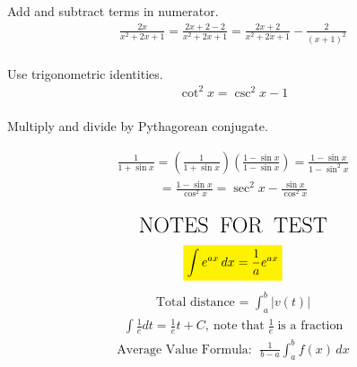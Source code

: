 \documentclass{report}
\begin{document}
Add and subtract terms in numerator.
\begin{align*}
	\frac{2 x}{x^2+2 x+1}=\frac{2 x+2-2}{x^2+2 x+1}=\frac{2 x+2}{x^2+2 x+1}-\frac{2}{(x+1)^2} \\
\end{align*}

Use trigonometric identities.
\begin{align*}
	\cot ^2 x=\csc ^2 x-1 \\
\end{align*}

Multiply and divide by Pythagorean conjugate.





\begin{align*}
	\frac{1}{1+\sin x}=\left(\frac{1}{1+\sin x}\right)\left(\frac{1-\sin x}{1-\sin x}\right)=\frac{1-\sin x}{1-\sin ^2 x}
\end{align*}
\begin{align*}
	=\frac{1-\sin x}{\cos ^2 x}=\sec ^2 x-\frac{\sin x}{\cos ^2 x} \\
\end{align*}

\begin{align*}
	\LARGE\text{NOTES \:FOR\: TEST}  \\
\end{align*}
\begin{equation*}
	\colorbox{yellow}{$\displaystyle \int e^{ax} \, dx = \frac{1}{a}e^{ax}$} \\\\
\end{equation*}
\begin{align*}
	\text{Total distance = } \int_a^b \big| v(t) \big|
\end{align*}
\begin{align*}
	\int\frac{1}{e}dt = \frac{1}{e}t + C,\: \text{note that}\;\frac{1}{e}\;\text{is a fraction}
\end{align*}
\begin{align*}
	\text{Average Value Formula: }\; \frac{1}{b-a} \int_{a}^{b}f(x)\,dx
\end{align*}
\\\\\\\\
\\\\
\\\\
\end{document}

